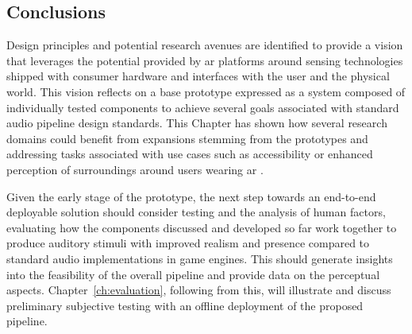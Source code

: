 \subsection{Conclusions}
Design principles and potential research avenues are identified to provide a vision that leverages the potential provided by \acrshort{ar} platforms around sensing technologies shipped with consumer hardware and interfaces with the user and the physical world. This vision reflects on a base prototype expressed as a system composed of individually tested components to achieve several goals associated with standard audio pipeline design standards. This Chapter has shown how several research domains could benefit from expansions stemming from the prototypes and addressing tasks associated with use cases such as accessibility or enhanced perception of surroundings around users wearing \acrshort{ar} .\par
Given the early stage of the prototype, the next step towards an end-to-end deployable solution should consider testing and the analysis of human factors, evaluating how the components discussed and developed so far work together to produce auditory stimuli with improved realism and presence compared to standard audio implementations in game engines. This should generate insights into the feasibility of the overall pipeline and provide data on the perceptual aspects. Chapter~\ref{ch:evaluation}, following from this, will illustrate and discuss preliminary subjective testing with an offline deployment of the proposed pipeline.
